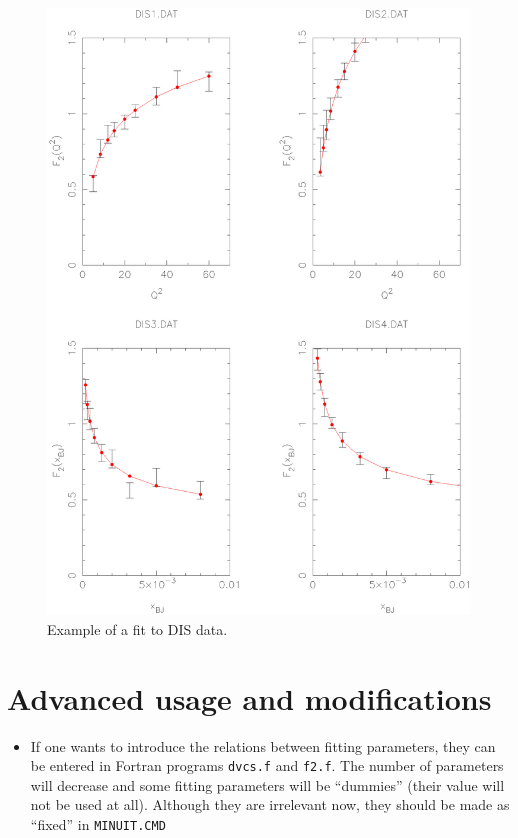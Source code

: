 \documentclass[12pt]{article}
\begin{document}
\begin{figure}[t]
\begin{center}
\includegraphics[scale=0.52]{examplefit}
\end{center}
\caption{Example of a fit to DIS data.}
\label{fig:fitps}
\end{figure}


\section{Advanced usage and modifications}

\begin{itemize}
\item If one wants to introduce the relations between fitting parameters, they
can be entered in Fortran programs \texttt{dvcs.f} and \texttt{f2.f}.
The number of parameters will decrease and some fitting parameters 
will be ``dummies'' (their value will not be used at all). 
Although they are irrelevant now, they should be made as
``fixed'' in \texttt{MINUIT.CMD}
\end{itemize}
\end{document}
